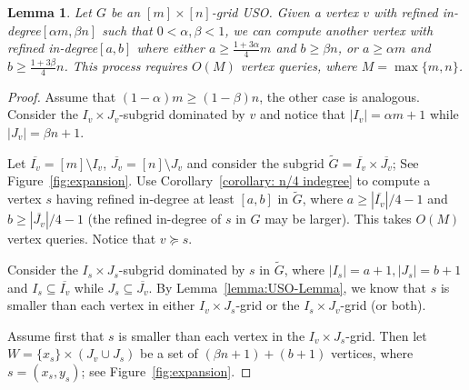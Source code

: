 \documentclass[a4paper,10pt]{article}
\newtheorem{lemma}{Lemma}
\newcommand{\indegree}{refined in-degree\xspace}
\begin{document}
\begin{lemma}\label{lemma:Constant fraction improvement}
Let $G$ be an $[m]\times[n]$-grid USO. 
Given a vertex $v$ with \indegree $[\alpha m, \beta n]$ such that $0 < \alpha, \beta < 1$, we can compute another vertex with \indegree $[a,b]$ where either $a\geq \frac{1+3\alpha}{4}m$ and $b \geq \beta n$, or $a \geq \alpha m$ and $b \geq \frac{1 + 3\beta}{4}n$. This process requires $O(M)$ vertex queries, where $M = \max\{m,n\}$.
\end{lemma}

\begin{proof}
Assume that $(1-\alpha) m \geq (1-\beta)n$, the other case is analogous. Consider the  $I_v\times J_v$-subgrid dominated by $v$ and 
notice that $|I_v| = \alpha m + 1$ while $|J_v| = \beta n + 1$. 

Let $\overline{I_v} = [m]\setminus I_v$, $\overline{J_v} = [n]\setminus J_v$ and consider the subgrid $\widetilde{G} = \overline{I_v} \times \overline{J_v}$; See Figure~\ref{fig:expansion}. Use Corollary~\ref{corollary: n/4 indegree} to compute a vertex $s$ having \indegree at least $[a,b]$ in $\widetilde{G}$, where $a \geq |\overline{I_v}|/4 - 1$ and $b \geq |\overline{J_v}|/4 - 1$ (the \indegree of $s$ in $G$ may be larger).
This takes $O(M)$ vertex queries. Notice that $v \succeq s$.

Consider the $I_{s}\times J_{s}$-subgrid dominated by $s$ in $\widetilde{G}$, where $|I_{s}| = a + 1, |J_{s}| = b + 1$ and $I_{s}\subseteq \overline{I_v}$ while $J_{s}\subseteq \overline{J_v}$. By Lemma~\ref{lemma:USO-Lemma}, we know that $s$ is smaller than each vertex in either $I_v\times J_{s}$-grid or the $I_{s}\times J_v$-grid (or both). 

Assume first that $s$ is smaller than each vertex in the $I_v\times J_{s}$-grid. Then let $W =  \{x_{s}\} \times (J_v\cup J_{s})$ be a set of $(\beta n + 1) + (b + 1)$ vertices, where $s = (x_{s}, y_{s})$; see Figure~\ref{fig:expansion}. 


\end{proof}
\end{document}

